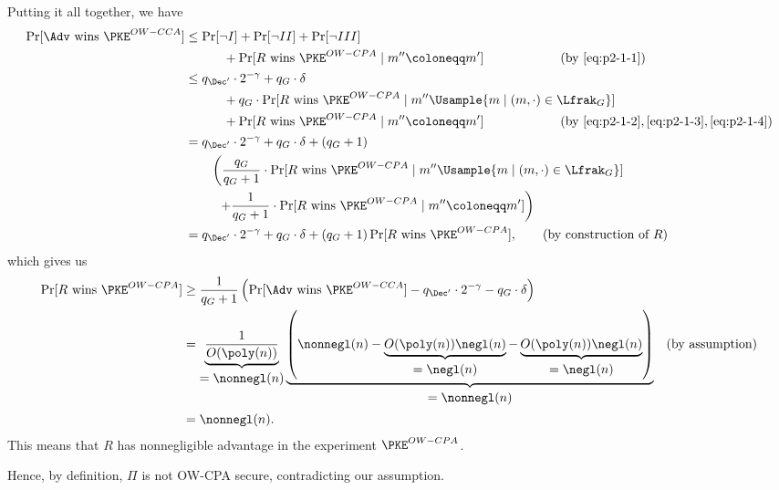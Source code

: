 \begin{answer}[i]
    Putting it all together, we have
    \begin{align*}
        \Pr[\Adv \textrm{ wins } \PKE^{OW-CCA}] 
        &\le \Pr[\neg I] + \Pr[\neg II]+ \Pr[\neg III]\\
        &\qquad\quad+\Pr[R \textrm{ wins } \PKE^{OW-CPA} \mid m''\coloneqq m']
        \qquad\qquad\qquad (\textrm{by } \eqref{eq:p2-1-1})\\
        &\le  q_{\Dec'} \cdot 2^{-\gamma} + q_G\cdot \delta \\
        &\qquad\quad + q_G\cdot \Pr[R\textrm{ wins } \PKE^{OW-CPA} \mid m'' \Usample \{m\mid (m, \cdot)\in\Lfrak_G\}]\\
        &\qquad\quad + \Pr[R \textrm{ wins } \PKE^{OW-CPA} \mid m''\coloneqq m']
        \qquad\qquad\qquad (\textrm{by } \eqref{eq:p2-1-2}, \eqref{eq:p2-1-3}, \eqref{eq:p2-1-4})\\
        &= q_{\Dec'} \cdot 2^{-\gamma} + q_G\cdot \delta + (q_G+1)\\
        &\qquad \left(\frac{q_G}{q_G+1}\cdot \Pr[R\textrm{ wins } \PKE^{OW-CPA} \mid m'' \Usample \{m\mid (m, \cdot)\in\Lfrak_G\}]\right.\\
        &\qquad\;\; \left.+ \frac{1}{q_G+1} \cdot \Pr[R \textrm{ wins } \PKE^{OW-CPA} \mid m''\coloneqq m']\right)\\
        &= q_{\Dec'} \cdot 2^{-\gamma} + q_G\cdot \delta + (q_G+1)\Pr[R \textrm{ wins } \PKE^{OW-CPA}],
        \qquad (\textrm{by construction of } R)
    \end{align*}
    which gives us
    \begin{align*}
        \Pr[R \textrm{ wins } \PKE^{OW-CPA}]
        &\ge \frac{1}{q_G+1}\left(\Pr[\Adv \textrm{ wins } \PKE^{OW-CCA}] - q_{\Dec'} \cdot 2^{-\gamma} - q_G\cdot \delta\right)\\
        &= \underbrace{\frac{1}{O(\poly(n))}}_{\begin{gathered}=\nonnegl(n)\end{gathered}}\underbrace{\left(\nonnegl(n) - \underbrace{O(\poly(n)) \negl(n)}_{\begin{gathered}=\negl(n)\end{gathered}}- \underbrace{O(\poly(n))\negl(n)}_{\begin{gathered}=\negl(n)\end{gathered}}\right)}_{\begin{gathered}=\nonnegl(n)\end{gathered}}
        && (\textrm{by assumption})\\
        &= \nonnegl(n).
    \end{align*}
    This means that $R$ has nonnegligible advantage in the experiment $\PKE^{OW-CPA}$.

    Hence, by definition, $\Pi$ is not OW-CPA secure, contradicting our assumption.
\end{answer}




















